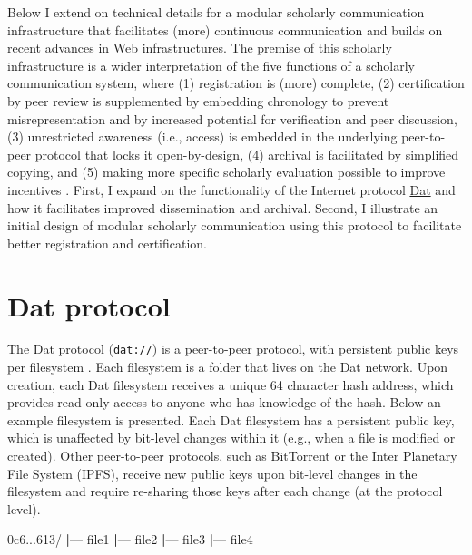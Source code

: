 \documentclass[publications,article,submit,moreauthors,pdftex,10pt,a4paper]{Definitions/mdpi}
\newenvironment{Shaded}{\begin{snugshade}}{\end{snugshade}}
\newcommand{\ExtensionTok}[1]{#1}
\newcommand{\KeywordTok}[1]{\textcolor[rgb]{0.13,0.29,0.53}{\textbf{#1}}}
\newcommand{\NormalTok}[1]{#1}
\begin{document}
Below I extend on technical details for a modular scholarly
communication infrastructure that facilitates (more) continuous
communication and builds on recent advances in Web
infrastructures. The premise of this scholarly infrastructure is a
wider interpretation of the five functions of a scholarly
communication system, where (1) registration is (more) complete, (2)
certification by peer review is supplemented by embedding chronology
to prevent misrepresentation and by increased potential for
verification and peer discussion, (3) unrestricted awareness (i.e.,
access) is embedded in the underlying peer-to-peer protocol that locks
it open-by-design, (4) archival is facilitated by simplified copying,
and (5) making more specific scholarly evaluation possible to improve
incentives \citep[for an initial proposal of such evaluation systems
  see][]{doi:10.3390/publications6020021}. First, I expand on the
functionality of the Internet protocol
\href{https://datproject.org}{Dat} and how it facilitates improved
dissemination and archival. Second, I illustrate an initial design of
modular scholarly communication using this protocol to facilitate
better registration and certification.

\section*{Dat protocol}\label{dat-protocol}

The Dat protocol (\texttt{dat://}) is a peer-to-peer protocol, with
persistent public keys per filesystem
\citep[see also \url{https://perma.cc/FX7M-H85Y};][]{doi:10.31219/osf.io/nsv2c, doi:10.1038/sdata.2018.221}. Each
filesystem is a folder that lives on the Dat network. Upon creation,
each Dat filesystem receives a unique 64 character hash address, which
provides read-only access to anyone who has knowledge of the
hash. Below an example filesystem is presented. Each Dat filesystem
has a persistent public key, which is unaffected by bit-level changes
within it (e.g., when a file is modified or created). Other
peer-to-peer protocols, such as BitTorrent or the Inter Planetary File
System (IPFS), receive new public keys upon bit-level changes in the
filesystem and require re-sharing those keys after each change (at the
protocol level).

\begin{Shaded}
\begin{Highlighting}[]
\ExtensionTok{0c6...613/}
\KeywordTok{|}\ExtensionTok{---}\NormalTok{ file1}
\KeywordTok{|}\ExtensionTok{---}\NormalTok{ file2}
\KeywordTok{|}\ExtensionTok{---}\NormalTok{ file3}
\KeywordTok{|}\ExtensionTok{---}\NormalTok{ file4}
\end{Highlighting}
\end{Shaded}
\end{document}
